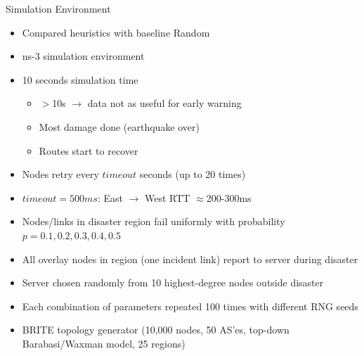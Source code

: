 \documentclass[pdftex]{beamer}
\begin{document}


\begin{frame}{Simulation Environment}
\begin{itemize}
	\item Compared heuristics with baseline Random
	\item ns-3 simulation environment
	\item 10 seconds simulation time
	\begin{itemize}
		\item $>$10s $\rightarrow$ data not as useful for early warning
		\item Most damage done (earthquake over)
		\item Routes start to recover
	\end{itemize}
	\item Nodes retry every $timeout$ seconds (up to 20 times)
	\item $timeout = 500ms$: East $\rightarrow$ West RTT $\approx$200-300ms
	\item Nodes/links in disaster region fail uniformly with probability $p = 0.1, 0.2, 0.3, 0.4, 0.5$
	\item All overlay nodes in region (one incident link) report to server during disaster
	\item Server chosen randomly from 10 highest-degree nodes outside disaster
	\item Each combination of parameters repeated 100 times with different RNG seeds
	\item BRITE topology generator (10,000 nodes, 50 AS'es, top-down Barabasi/Waxman model, 25 regions)
\end{itemize}
\end{frame}
\end{document}
